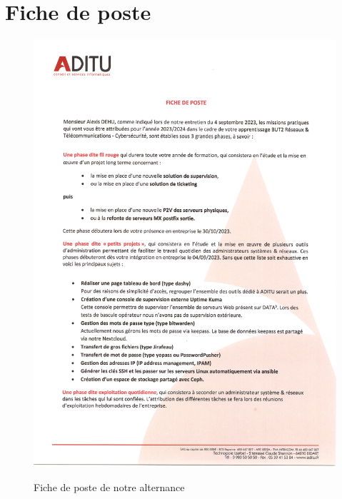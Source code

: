 \section{Fiche de poste}

\begin{figure}[H]
    \centering
    \includegraphics[width=\textwidth - \textwidth / 20]{Document20240116_132151.pdf}
    \figurename
    \caption{Fiche de poste de notre alternance}
    \label{fig:poste}
\end{figure}